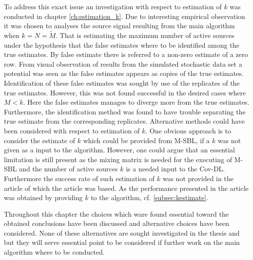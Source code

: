 To address this exact issue an investigation with respect to estimation of $k$ was conducted in chapter \ref{ch:estimation_k}. 
Due to interesting empirical observation it was chosen to analyses the source signal resulting from the main algorithm when $k = N = \widetilde{M}$. 
That is estimating the maximum number of active sources under the hypothesis that the false estimates where to be identified among the true estimates. By false estimate there is referred to a non-zero estimate of a zero row. 
From visual observation of results from the simulated stochastic data set a potential was seen as the false estimates appears as copies of the true estimates. 
Identification of these false estimates was sought by use of the replicates of the true estimates.
However, this was not found successful in the desired cases where $M<k$. 
Here the false estimates manages to diverge more from the true estimates. 
Furthermore, the identification method was found to have trouble separating the true estimate from the corresponding replicates.
Alternative methods could have been considered with respect to estimation of $k$. 
One obvious approach is to consider the estimate of $k$ which could be provided from M-SBL, if a $k$ was not given as a input to the algorithm. 
However, one could argue that an essential limitation is still present as the mixing matrix is needed for the executing of M-SBL and the number of active sources $k$ is a needed input to the Cov-DL. Furthermore the success rate of such estimation of $k$ was not provided in the article  \cite{Balkan2014} of which the article was based. As the performance presented in the article was obtained by providing $k$ to the algorithm, cf. \ref{subsec:kestimate}.   

Throughout this chapter the choices which ware found essential toward the obtained conclusions have been discussed and alternative choices have been considered.  
None of these alternatives are sought investigated in the thesis and but they will serve essential point to be considered if further work on the main algorithm where to be conducted.


      
        


       
 
